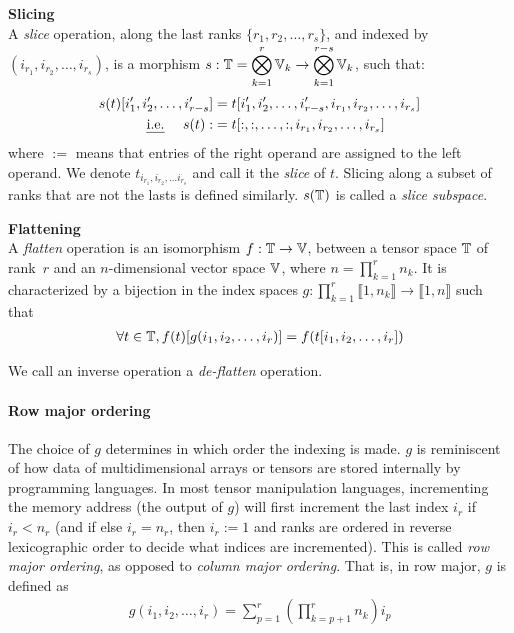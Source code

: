 \begin{definition}\textbf{Slicing}\\
A \emph{slice} operation, along the last ranks $\{r_1, r_2, \ldots, r_s\}$, and indexed by $(i_{r_1}, i_{r_2}, \ldots, i_{r_s})$, is a morphism $s: \mathbb{T} = \displaystyle \bigotimes_{k=1}^r \mathbb{V}_k \rightarrow \displaystyle \bigotimes_{k=1}^{r-s} \mathbb{V}_k$, such that:
\begin{align*}
s(t)[i'_1, i'_2, \ldots, i'_{r-s}] &= t[i'_1, i'_2, \ldots, i'_{r-s}, i_{r_1}, i_{r_2}, \ldots, i_{r_s}] \\
\text{ \emph{i.e.}~} \quad s(t) :&= t[:,:, \ldots, :, i_{r_1}, i_{r_2}, \ldots, i_{r_s}]
\end{align*}
where $:=$ means that entries of the right operand are assigned to the left operand.
We denote $t_{i_{r_1}, i_{r_2}, \ldots i_{r_s}}$ and call it the \emph{slice} of $t$. 
Slicing along a subset of ranks that are not the lasts is defined similarly.
$s(\mathbb{T})$ is called a \emph{slice subspace}.
\end{definition}

\begin{definition}\textbf{Flattening}\\
A \emph{flatten} operation is an isomorphism $f: \mathbb{T} \rightarrow \mathbb{V}$, between a tensor space $\mathbb{T}$ of rank~$r$ and an $n$-dimensional vector space $\mathbb{V}$, where $n =\displaystyle \prod_{k=1}^r n_k$. It is characterized by a bijection in the index spaces $g: \displaystyle \prod_{k=1}^r \llbracket 1, n_k \rrbracket \rightarrow \llbracket 1, n \rrbracket$ such that
\begin{gather*}
  \forall t \in \mathbb{T}, f(t)[g(i_1, i_2, \ldots, i_r)] = f(t[i_1, i_2, \ldots, i_r])
\end{gather*}

We call an inverse operation a \emph{de-flatten} operation.
\end{definition}

\paragraph{Row major ordering}
The choice of $g$ determines in which order the indexing is made. $g$ is reminiscent of how data of multidimensional arrays or tensors are stored internally by programming languages. In most tensor manipulation languages, incrementing the memory address (\ie the output of $g$) will first increment the last index $i_r$ if $i_r < n_r$ (and if else $i_r = n_r$, then $i_r := 1$ and ranks are ordered in reverse lexicographic order to decide what indices are incremented). This is called \emph{row major ordering}, as opposed to \emph{column major ordering}. That is, in row major, $g$ is defined as
\begin{align}
  g(i_1, i_2, \ldots, i_r) = \displaystyle \sum_{p=1}^r \left( \prod_{k=p+1}^r n_k \right) i_p \label{eq:rowmajor}
\end{align}

